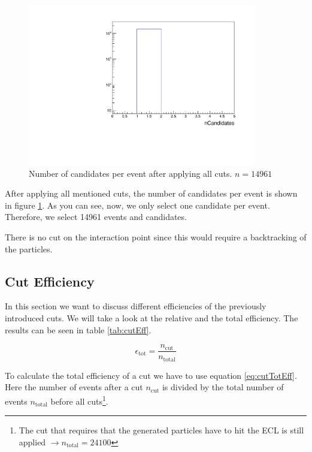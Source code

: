 \documentclass[a4paper,11pt,twosided,final,german,openbib,pdftex,listof=totoc,bibliography=totoc]{scrbook}
\begin{document}
\begin{figure}[h!]
	\centering
	\includegraphics[width=10cm]{Cuts/nCand.pdf}
	\caption[Number Of Candidates Per Event (All Cuts)]{Number of candidates per event after applying all cuts. $n = 14961$}	
	\label{fig:nCand}
\end{figure}

After applying all mentioned cuts, the number of candidates per event is shown in figure \ref{fig:nCand}. As you can see, now, we only select one candidate per event. Therefore, we select 14961 events and candidates.

There is no cut on the interaction point since this would require a backtracking of the particles.




\subsection{Cut Efficiency}

In this section we want to discuss different efficiencies of the previously introduced cuts. We will take a look at the relative and the total efficiency. The results can be seen in table \ref{tab:cutEff}.

\begin{equation}
	\epsilon_{\textrm{tot}} = \frac{n_{\textrm{cut}}}{n_{\textrm{total}}}
	\label{eq:cutTotEff}
\end{equation}

To calculate the total efficiency of a cut we have to use equation \ref{eq:cutTotEff}. Here the number of events after a cut $n_{\textrm{cut}}$ is divided by the total number of events $n_{\textrm{total}}$ before all cuts\footnote{The cut that requires that the generated particles have to hit the ECL is still applied $\rightarrow n_{\textrm{total}} = 24100$}.
\end{document}
